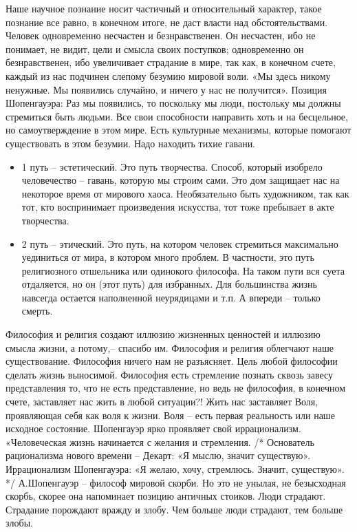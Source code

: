 \documentclass[12pt]{article}
\begin{document}
Наше научное познание носит частичный и относительный характер, такое познание все равно, в конечном
итоге, не даст власти над обстоятельствами. Человек одновременно несчастен и безнравственен. Он несчастен,
ибо не понимает, не видит, цели и смысла своих поступков; одновременно он безнравственен, ибо увеличивает
страдание в мире, так как, в конечном счете, каждый из нас подчинен слепому безумию мировой воли.
«Мы здесь никому ненужные. Мы появились случайно, и ничего у нас не получится».
Позиция Шопенгауэра: Раз мы появились, то поскольку мы люди, постольку мы должны стремиться быть
людьми.  Все  свои  способности  направить  хоть  и  на  бесцельное,  но  самоутверждение  в  этом  мире.  Есть
культурные механизмы, которые помогают существовать в этом безумии. Надо находить тихие гавани.
\begin{itemize}
\item 1 путь – эстетический. Это путь творчества. Способ, который изобрело человечество – гавань, которую мы 
строим сами. Это дом защищает нас на некоторое время от мирового хаоса. Необязательно быть художником,
так как тот, кто воспринимает произведения искусства, тот тоже пребывает в акте творчества.
\item 2 путь – этический. Это путь, на котором человек стремиться максимально уединиться от мира, в котором много
проблем. В частности, это путь религиозного отшельника или одинокого философа. На таком пути вся суета
отдаляется,  но  он  (этот  путь)  для  избранных.  Для  большинства  жизнь  навсегда  остается  наполненной
неурядицами и т.п. А впереди – только смерть.
\end{itemize}
Философия и религия создают иллюзию жизненных ценностей и иллюзию смысла жизни, а потому,– спасибо
им. Философия и религия облегчают наше существование.
Философия ничего нам не разъясняет. Цель любой философии сделать жизнь выносимой. Философия есть
стремление познать  сквозь завесу  представления то,  что не есть  представление,  но ведь  не философия,  в
конечном счете, заставляет нас жить в любой ситуации?! Жить нас заставляет Воля, проявляющая себя как воля
к жизни. 
Воля – есть первая реальность или наше исходное состояние.
Шопенгауэр ярко проявляет свой иррационализм. «Человеческая жизнь начинается с желания и стремления. /*
Основатель  рационализма  нового  времени  –  Декарт:  «Я  мыслю,  значит  существую».  Иррационализм
Шопенгауэра: «Я желаю, хочу, стремлюсь. Значит, существую». */
А.Шопенгауэр – философ мировой скорби. Но это не унылая, не безысходная скорбь, скорее она напоминает
позицию античных стоиков.
Люди  страдают.  Страдание  порождают  вражду  и  злобу.  Чем  больше  люди  страдают,  тем  больше  злобы.
\end{document}

